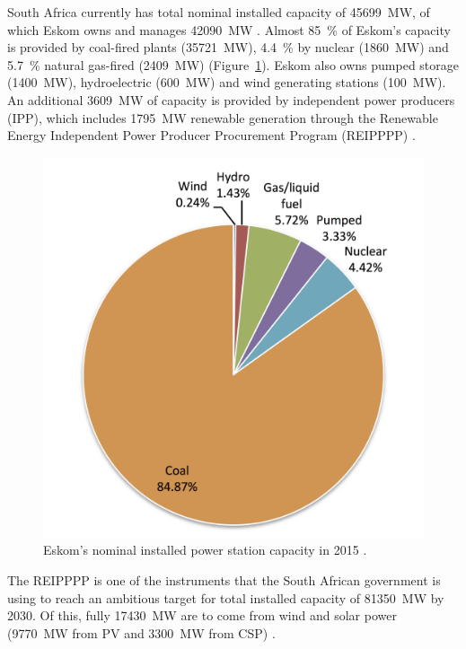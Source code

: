 South Africa currently has total nominal installed capacity of \SI{45699}{\mega\watt}, of which Eskom owns and manages \SI{42090}{\mega\watt} \cite{Eskom2015b}. Almost \SI{85}{\percent} of Eskom's capacity is provided by coal-fired plants (\SI{35721}{\mega\watt}), \SI{4.4}{\percent} by nuclear (\SI{1860}{\mega\watt}) and \SI{5.7}{\percent} natural gas-fired (\SI{2409}{\mega\watt}) (Figure~\ref{PgenerationEskom}). Eskom also owns pumped storage (\SI{1400}{\mega\watt}), hydroelectric (\SI{600}{\mega\watt}) and wind generating stations (\SI{100}{\mega\watt}). An additional \SI{3609}{\mega\watt} of capacity is provided by independent power producers (IPP), which includes \SI{1795}{\mega\watt} renewable generation through the Renewable Energy Independent Power Producer Procurement Program (REIPPPP) \cite{Eskom2015a}.

\begin{figure}[htbp]  
\centering
\includegraphics[width=0.45\linewidth]{FIG/Pgenerationeskom}
\caption[Eskom's nominal installed power station capacity in 2015.]{Eskom's nominal installed power station capacity in 2015 \cite{Eskom2015a}.}\label{PgenerationEskom}
\end{figure}
%
The REIPPPP is one of the instruments that the South African government is using to reach an ambitious target for total installed capacity of \SI{81350}{\mega\watt} by 2030. Of this, fully \SI{17430}{\mega\watt} are to come from wind and solar power (\SI{9770}{\mega\watt} from PV and \SI{3300}{\mega\watt} from CSP) \cite{DoE2013}.


